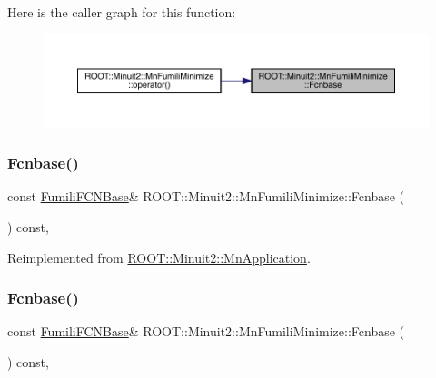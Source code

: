 Here is the caller graph for this function\+:
\nopagebreak
\begin{figure}[H]
\begin{center}
\leavevmode
\includegraphics[width=350pt]{dc/d88/classROOT_1_1Minuit2_1_1MnFumiliMinimize_a4540fd0311c15810965864988d4c70d1_icgraph}
\end{center}
\end{figure}
\mbox{\label{classROOT_1_1Minuit2_1_1MnFumiliMinimize_a4540fd0311c15810965864988d4c70d1}} 
\subsubsection{\texorpdfstring{Fcnbase()}{Fcnbase()}\hspace{0.1cm}{\footnotesize\ttfamily [2/3]}}
{\footnotesize\ttfamily const \mbox{\hyperlink{classROOT_1_1Minuit2_1_1FumiliFCNBase}{Fumili\+F\+C\+N\+Base}}\& R\+O\+O\+T\+::\+Minuit2\+::\+Mn\+Fumili\+Minimize\+::\+Fcnbase (\begin{DoxyParamCaption}{ }\end{DoxyParamCaption}) const\hspace{0.3cm}{\ttfamily [inline]}, {\ttfamily [virtual]}}



Reimplemented from \mbox{\hyperlink{classROOT_1_1Minuit2_1_1MnApplication_af4eb3fe4927d3a8e0efcd5c6b7100881}{R\+O\+O\+T\+::\+Minuit2\+::\+Mn\+Application}}.

\mbox{\label{classROOT_1_1Minuit2_1_1MnFumiliMinimize_a4540fd0311c15810965864988d4c70d1}} 
\subsubsection{\texorpdfstring{Fcnbase()}{Fcnbase()}\hspace{0.1cm}{\footnotesize\ttfamily [3/3]}}
{\footnotesize\ttfamily const \mbox{\hyperlink{classROOT_1_1Minuit2_1_1FumiliFCNBase}{Fumili\+F\+C\+N\+Base}}\& R\+O\+O\+T\+::\+Minuit2\+::\+Mn\+Fumili\+Minimize\+::\+Fcnbase (\begin{DoxyParamCaption}{ }\end{DoxyParamCaption}) const\hspace{0.3cm}{\ttfamily [inline]}, {\ttfamily [virtual]}}



